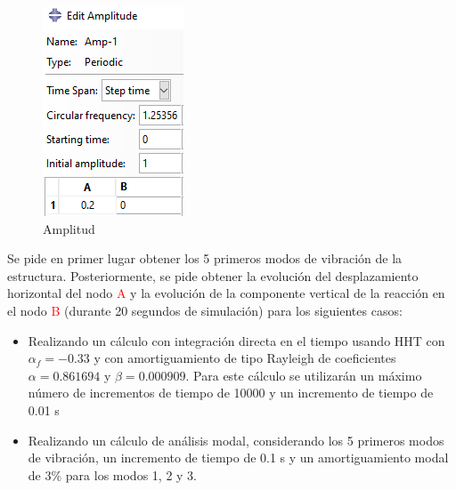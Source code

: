 \documentclass[a4paper,12pt]{article}
\begin{document}
\begin{figure}[hb]
\begin{minipage}[b]{0.25\linewidth}
\includegraphics[width=\textwidth]{amplitud.png}
\caption{Amplitud}
\label{fig:amplitud}
\end{minipage}
\end{figure}

Se pide en primer lugar obtener los 5 primeros modos de vibración de la estructura. Posteriormente, se pide obtener la evolución del desplazamiento horizontal del nodo \textcolor{red}{A} y la evolución de la componente vertical de la reacción en el nodo \textcolor{red}{B} (durante 20 segundos de simulación) para los siguientes casos:

\begin{itemize}

    \item Realizando un cálculo con integración directa en el tiempo usando HHT con $\alpha_f=-0.33$ y con amortiguamiento de tipo Rayleigh de coeficientes $\alpha=0.861694$ y $\beta=0.000909$. Para este cálculo se utilizarán un máximo número de incrementos de tiempo de 10000 y un incremento de tiempo de 0.01 s
    \item Realizando un cálculo de análisis modal, considerando los 5 primeros modos de vibración, un incremento de tiempo de 0.1 s y un amortiguamiento modal de $3 \%$ para los modos 1, 2 y 3.

\end{itemize}
\end{document}
